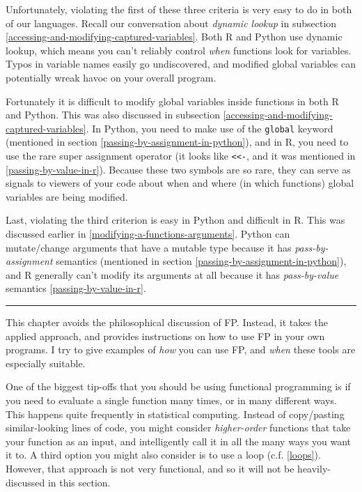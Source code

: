 \documentclass[
  12pt,
  krantz2]{krantz}
\begin{document}
Unfortunately, violating the first of these three criteria is very easy to do in both of our languages. Recall our conversation about \emph{dynamic lookup} in subsection \ref{accessing-and-modifying-captured-variables}. Both R and Python use dynamic lookup, which means you can't reliably control \emph{when} functions look for variables. Typos in variable names easily go undiscovered, and modified global variables can potentially wreak havoc on your overall program.

Fortunately it is difficult to modify global variables inside functions in both R and Python. This was also discussed in subsection \ref{accessing-and-modifying-captured-variables}. In Python, you need to make use of the \texttt{global} keyword (mentioned in section \ref{passing-by-assignment-in-python}), and in R, you need to use the rare super assignment operator (it looks like \texttt{\textless{}\textless{}-}, and it was mentioned in \ref{passing-by-value-in-r}). Because these two symbols are so rare, they can serve as signals to viewers of your code about when and where (in which functions) global variables are being modified.

Last, violating the third criterion is easy in Python and difficult in R. This was discussed earlier in \ref{modifying-a-functions-arguments}. Python can mutate/change arguments that have a mutable type because it has \emph{pass-by-assignment} semantics (mentioned in section \ref{passing-by-assignment-in-python}), and R generally can't modify its arguments at all because it has \emph{pass-by-value} semantics \ref{passing-by-value-in-r}.

\begin{center}\rule{0.5\linewidth}{0.5pt}\end{center}

This chapter avoids the philosophical discussion of FP. Instead, it takes the applied approach, and provides instructions on how to use FP in your own programs. I try to give examples of \emph{how} you can use FP, and \emph{when} these tools are especially suitable.

One of the biggest tip-offs that you should be using functional programming is if you need to evaluate a single function many times, or in many different ways. This happens quite frequently in statistical computing. Instead of copy/pasting similar-looking lines of code, you might consider \emph{higher-order} functions that take your function as an input, and intelligently call it in all the many ways you want it to. A third option you might also consider is to use a loop (c.f. \ref{loops}). However, that approach is not very functional, and so it will not be heavily-discussed in this section.
\end{document}
